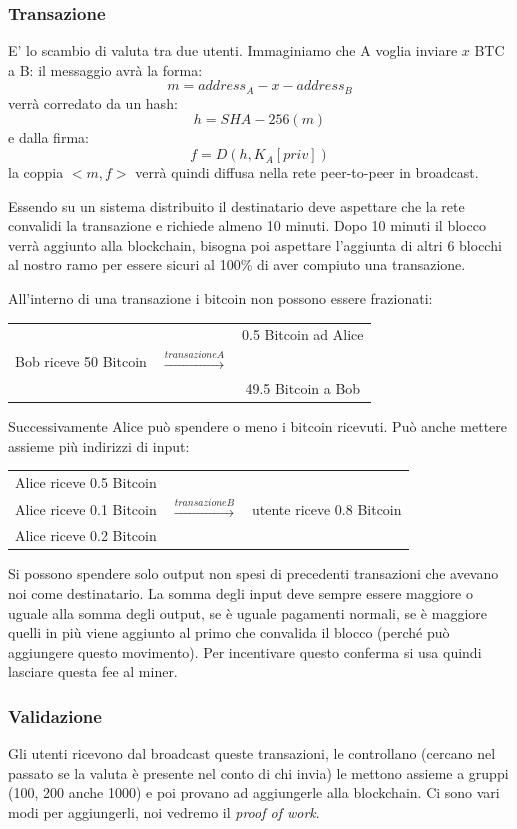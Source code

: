 \subsubsection{Transazione}
E' lo scambio di valuta tra due utenti. Immaginiamo che A voglia inviare $x$ BTC a B: il messaggio avrà la forma:
$$ m = address_A - x - address_B$$
verrà corredato da un hash:
$$ h = SHA-256(m)$$
e dalla firma:
$$ f = D(h, K_A[priv]) $$
la coppia $<m, f>$ verrà quindi diffusa nella rete peer-to-peer in broadcast.

Essendo su un sistema distribuito il destinatario deve aspettare che la rete convalidi la transazione e richiede almeno 10 minuti.
Dopo 10 minuti il blocco verrà aggiunto alla blockchain, bisogna poi aspettare l'aggiunta di altri 6 blocchi al nostro ramo per essere sicuri al 100\% di aver compiuto una transazione.

All'interno di una transazione i bitcoin non possono essere frazionati:
\begin{table}[ht!]
    \centering
    \begin{tabular}{c c c}
         &  & 0.5 Bitcoin ad Alice \\
        Bob riceve 50 Bitcoin &  $\xrightarrow{transazione A}$ &\\
         & & 49.5 Bitcoin a Bob
    \end{tabular}
\end{table}

Successivamente Alice può spendere o meno i bitcoin ricevuti.
Può anche mettere assieme più indirizzi di input:
\begin{table}[ht!]
    \centering
    \begin{tabular}{c c c}
        Alice riceve 0.5 Bitcoin & & \\
        Alice riceve 0.1 Bitcoin & $\xrightarrow{transazione B}$ & utente riceve 0.8 Bitcoin\\
        Alice riceve 0.2 Bitcoin & &
    \end{tabular}
\end{table}

Si possono spendere solo output non spesi di precedenti transazioni che avevano noi come destinatario.
La somma degli input deve sempre essere maggiore o uguale alla somma degli output, se è uguale pagamenti normali, se è maggiore quelli in più viene aggiunto al primo che convalida il blocco (perché può aggiungere questo movimento).
Per incentivare questo conferma si usa quindi lasciare questa fee al miner.

\subsubsection{Validazione}
Gli utenti ricevono dal broadcast queste transazioni, le controllano (cercano nel passato se la valuta è presente nel conto di chi invia) le mettono assieme a gruppi (100, 200 anche 1000) e poi provano ad aggiungerle alla blockchain.
Ci sono vari modi per aggiungerli, noi vedremo il \emph{proof of work}.

